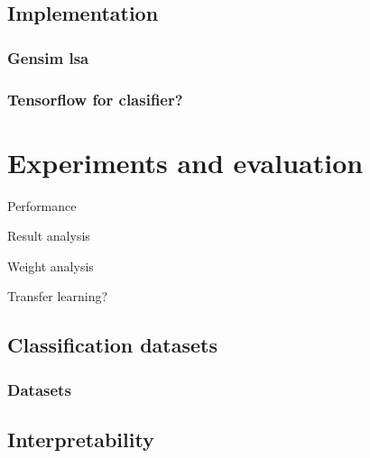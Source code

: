     \section{Implementation}
        \cite{bird2009natural} %
        \subsection{Gensim lsa}
        \subsection{Tensorflow for clasifier?}
    \*

\chapter{Experiments and evaluation}

    Performance
    
    Result analysis
    
    Weight analysis
    
    Transfer learning?

    \section{Classification datasets}
        \subsection{Datasets}
            \cite{conneau2017supervised} %

    \section{Interpretability}
        \cite{ribeiro2016should} %


